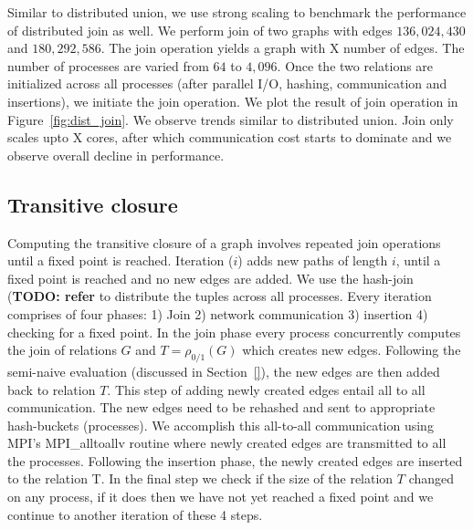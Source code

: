 Similar to distributed union, we use strong scaling to benchmark the performance of distributed join as well.
We perform join of two graphs with edges $136,024,430$ and $180,292,586$. The join operation yields a graph with X number of edges.
The number of processes are varied from $64$ to $4,096$. 
Once the two relations are initialized across all processes (after parallel I/O, hashing, communication and insertions), we initiate the join operation. 
We plot the result of join operation in Figure~\ref{fig:dist_join}. We observe trends similar to distributed union.
Join only scales upto X cores, after which communication cost starts to dominate and we observe overall decline in performance.


\subsection{Transitive closure}
\label{sec:tc}

Computing the transitive closure of a graph involves repeated join operations until a fixed point is reached. 
Iteration ($i$) adds new paths of length $i$, until a fixed point is reached and no new edges are added.
We use the hash-join (\textbf{TODO: refer} to distribute the tuples across all processes.
Every iteration comprises of four phases: 1) Join 2) network communication 3) insertion 4) checking for a
fixed point. In the join phase every process concurrently computes the join of relations $G$ and $T = \rho_{0 / 1}(G)$ which creates new edges. Following the semi-naive evaluation (discussed in Section~\ref{}), the new edges are then added back to relation $T$. This step of adding newly created edges entail all to all communication. The new edges need to be rehashed and sent to appropriate hash-buckets (processes). 
We accomplish this all-to-all communication using MPI’s MPI\_alltoallv routine where newly created edges are transmitted to all the processes.
Following the insertion phase, the newly created edges are inserted to the relation T.
In the final step we check if the size of the relation $T$ changed on any process, if it does then we have not yet reached a fixed point and we continue to
another iteration of these 4 steps.



